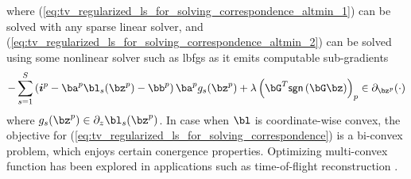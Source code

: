 \documentclass[../writeup.tex]{subfiles}
\begin{document}
where (\ref{eq:tv_regularized_ls_for_solving_correspondence_altmin_1}) can be solved with any sparse linear solver, and (\ref{eq:tv_regularized_ls_for_solving_correspondence_altmin_2}) can be solved using some nonlinear solver such as lbfgs as it emits computable sub-gradients 
\begin{align}
     -\sum_{s=1}^S 
            \left( \si^p - \ba^p \bl_s(\bz^p) - \bb^p \right) \ba^p g_s(\bz^p)
            + \lambda \left( \bG^T \textsf{sgn}\left( \bG \bz \right) \right)_p
        \in \partial_{\bz^p}(\cdot)
    \label{eq:tv_regularized_ls_for_solving_correspondence_altmin_1_gradient}
\end{align}
where $g_s(\bz^p) \in \partial_{z}\bl_s(\bz^p)$. In case when $\bl$ is coordinate-wise convex, the objective for (\ref{eq:tv_regularized_ls_for_solving_correspondence}) is a bi-convex problem, which enjoys certain conergence properties. Optimizing multi-convex function has been explored in applications such as time-of-flight reconstruction \cite{heideNonlineofsightImagingPartial2017}.
 




\end{document}
